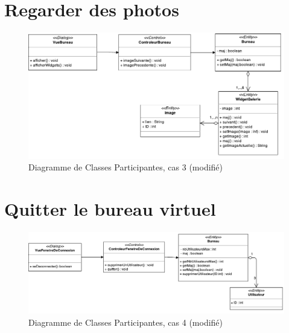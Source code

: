\section{Regarder des photos}
\begin{figure}[H]
	\centering
	\includegraphics[angle=90]{diagrammes/DCP4.pdf}
	\caption{\color{green}Diagramme de Classes Participantes, cas 3 (modifié)\color{black}}
\end{figure}

\section{Quitter le bureau virtuel}

\begin{figure}[H]
	\centering
	\includegraphics[angle=90]{diagrammes/DCP5.pdf}
	\caption{\color{ForestGreen}Diagramme de Classes Participantes, cas 4 (modifié)\color{black}}
\end{figure}